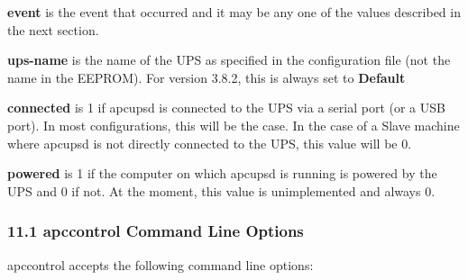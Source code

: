 \begin{description}

\item {\bf event}
is the event that occurred and it may be any one of the values described in
the next section.  

\item {\bf ups-name}
is the name of the UPS as specified in the configuration file (not the name in
the EEPROM). For version 3.8.2, this is always set to {\bf Default}  

\item {\bf connected}
is 1 if apcupsd is connected to the UPS via a serial port (or a USB port). In
most configurations, this will be the case. In the case of a Slave machine
where apcupsd is not directly connected to the UPS, this value will be 0.  

\item {\bf powered}
is 1 if the computer on which apcupsd is running is powered by the UPS and 0
if not.  At the moment, this value is unimplemented and always 0. 
\end{description}

\label{apccontrol-Command-Line-Options}

\subsubsection*{11.1 apccontrol Command Line Options}

apccontrol accepts the following command line options:  

